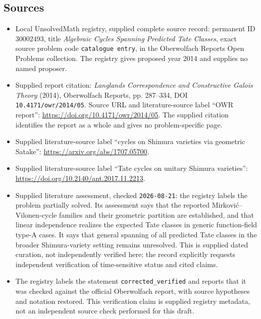 \documentclass[11pt]{article}
\begin{document}
\subsection{Sources}
\begin{itemize}
\item Local UnsolvedMath registry, supplied complete source record: permanent ID \(30002493\), title \emph{Algebraic Cycles Spanning Predicted Tate Classes}, exact source problem code \texttt{catalogue entry}, in the Oberwolfach Reports Open Problems collection. The registry gives proposed year 2014 and supplies no named proposer.
\item Supplied report citation: \emph{Langlands Correspondence and Constructive Galois Theory} (2014), Oberwolfach Reports, pp. 287--334, DOI \texttt{10.4171/owr/2014/05}. Source URL and literature-source label ``OWR report'': \url{https://doi.org/10.4171/owr/2014/05}. The supplied citation identifies the report as a whole and gives no problem-specific page.
\item Supplied literature-source label ``cycles on Shimura varieties via geometric Satake'': \url{https://arxiv.org/abs/1707.05700}.
\item Supplied literature-source label ``Tate cycles on unitary Shimura varieties'': \url{https://doi.org/10.2140/ant.2017.11.2213}.
\item Supplied literature assessment, checked \texttt{2026-08-21}: the registry labels the problem partially solved. Its assessment says that the reported Mirković–Vilonen-cycle families and their geometric partition are established, and that linear independence realizes the expected Tate classes in generic function-field type-A cases. It says that general spanning of all predicted Tate classes in the broader Shimura-variety setting remains unresolved. This is supplied dated curation, not independently verified here; the record explicitly requests independent verification of time-sensitive status and cited claims.
\item The registry labels the statement \texttt{corrected\_verified} and reports that it was checked against the official Oberwolfach report, with source hypotheses and notation restored. This verification claim is supplied registry metadata, not an independent source check performed for this draft.
\end{itemize}
\end{document}
